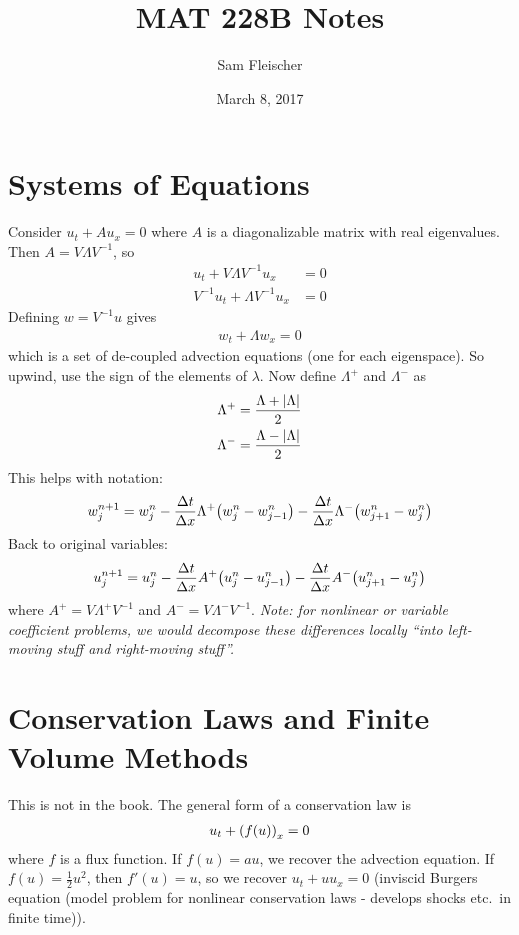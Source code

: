 \documentclass{article}
\title{MAT 228B Notes}
\author{Sam Fleischer}
\date{March 8, 2017}
\newcommand{\Dx}{\Delta x}
\newcommand{\Dt}{\Delta t}
\begin{document}
    \maketitle

    \section{Systems of Equations}

        Consider $u_t + Au_x = 0$ where $A$ is a diagonalizable matrix with real eigenvalues.  Then $A = V\Lambda V^{-1}$, so
        \begin{align*}
            u_t + V\Lambda V^{-1}u_x &= 0 \\
            V^{-1}u_t + \Lambda V^{-1}u_x &= 0
        \end{align*}
        Defining $w = V^{-1}u$ gives
        \begin{align*}
            w_t + \Lambda w_x = 0
        \end{align*}
        which is a set of de-coupled advection equations (one for each eigenspace).  So upwind, use the sign of the elements of $\lambda$.  Now define $\Lambda^+$ and $\Lambda^-$ as
        \begin{align*}
            \Lambda^+ = \frac{\Lambda + \abs{\Lambda}}{2} \\
            \Lambda^- = \frac{\Lambda - \abs{\Lambda}}{2}
        \end{align*}
        This helps with notation:
        \begin{align*}
            w_j^{n+1} = w_j^n - \frac{\Dt}{\Dx}\Lambda^+\qty(w_j^n - w_{j-1}^n) - \frac{\Dt}{\Dx}\Lambda^-\qty(w_{j+1}^n - w_j^n)
        \end{align*}
        Back to original variables:
        \begin{align*}
            u_j^{n+1} = u_j^n - \frac{\Dt}{\Dx}A^+\qty(u_j^n - u_{j-1}^n) - \frac{\Dt}{\Dx}A^-\qty(u_{j+1}^n - u_j^n)
        \end{align*}
        where $A^+ = V\Lambda^+V^{-1}$ and $A^- = V\Lambda^-V^{-1}$.  \emph{Note: for nonlinear or variable coefficient problems, we would decompose these differences locally ``into left-moving stuff and right-moving stuff''.}

    \section{Conservation Laws and Finite Volume Methods}

        This is not in the book.  The general form of a conservation law is
        \begin{align*}
            u_t + \qty(f(u))_x = 0
        \end{align*}
        where $f$ is a flux function.  If $f(u) = au$, we recover the advection equation.  If $f(u) = \frac{1}{2}u^2$, then $f'(u) = u$, so we recover $u_t + u u_x = 0$ (inviscid Burgers equation (model problem for nonlinear conservation laws - develops shocks etc.~in finite time)). \\
\end{document}
